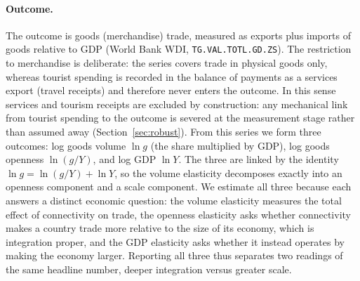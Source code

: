 \paragraph{Outcome.} The outcome is goods (merchandise) trade, measured as
exports plus imports of goods relative to GDP (World Bank WDI,
\texttt{TG.VAL.TOTL.GD.ZS}). The restriction to merchandise is deliberate:
the series covers trade in physical goods only, whereas tourist spending is
recorded in the balance of payments as a services export (travel receipts)
and therefore never enters the outcome. In this sense services and tourism
receipts are excluded by construction: any mechanical link from tourist
spending to the outcome is severed at the measurement stage rather than
assumed away (Section~\ref{sec:robust}). From this series we form
three outcomes: log goods volume $\ln g$ (the share multiplied by GDP), log
goods openness $\ln(g/Y)$, and log GDP $\ln Y$. The three are linked by the
identity $\ln g = \ln(g/Y) + \ln Y$, so the volume elasticity decomposes
exactly into an openness component and a scale component. We estimate all
three because each answers a distinct economic question: the volume
elasticity measures the total effect of connectivity on trade, the openness
elasticity asks whether connectivity makes a country trade more relative to
the size of its economy, which is integration proper, and the GDP elasticity
asks whether it instead operates by making the economy larger. Reporting all
three thus separates two readings of the same headline number, deeper
integration versus greater scale.

